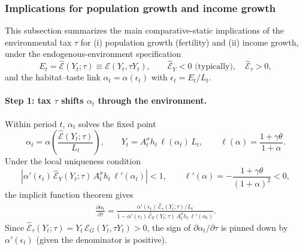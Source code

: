 \documentclass[11pt]{article}
\begin{document}
\subsubsection{Implications for population growth and income growth}

This subsection summarizes the main comparative-static implications of the environmental tax $\tau$ for
(i) population growth (fertility) and (ii) income growth, under the endogenous-environment specification
\[
E_t=\widehat{\mathcal{E}}(Y_t;\tau)\equiv \mathcal{E}(Y_t,\tau Y_t),
\qquad \widehat{\mathcal{E}}_Y<0 \text{ (typically)},\quad \widehat{\mathcal{E}}_\tau>0,
\]
and the habitat--taste link $\alpha_t=\alpha(\epsilon_t)$ with $\epsilon_t=E_t/L_t$.

\paragraph{Step 1: tax $\tau$ shifts $\alpha_t$ through the environment.}
Within period $t$, $\alpha_t$ solves the fixed point
\[
\alpha_t=\alpha\!\left(\frac{\widehat{\mathcal{E}}(Y_t;\tau)}{L_t}\right),
\qquad
Y_t=A_t^\sigma h_t\,\ell(\alpha_t)\,L_t,
\qquad
\ell(\alpha)=\frac{1+\gamma\theta}{1+\alpha}.
\]
Under the local uniqueness condition
\[
\left|\alpha'(\epsilon_t)\,\widehat{\mathcal{E}}_Y(Y_t;\tau)\,A_t^\sigma h_t\,\ell'(\alpha_t)\right|<1,
\qquad
\ell'(\alpha)=-\frac{1+\gamma\theta}{(1+\alpha)^2}<0,
\]
the implicit function theorem gives
\begin{align}
\frac{\partial \alpha_t}{\partial \tau}
=
\frac{\alpha'(\epsilon_t)\,\widehat{\mathcal{E}}_\tau(Y_t;\tau)/L_t}
{1-\alpha'(\epsilon_t)\,\widehat{\mathcal{E}}_Y(Y_t;\tau)\,A_t^\sigma h_t\,\ell'(\alpha_t)}.
\label{eq:dalpha_dtau_implications}
\end{align}
Since $\widehat{\mathcal{E}}_\tau(Y_t;\tau)=Y_t\,\mathcal{E}_G(Y_t,\tau Y_t)>0$,
the sign of $\partial \alpha_t/\partial\tau$ is pinned down by $\alpha'(\epsilon_t)$ (given the denominator is positive).
\end{document}
